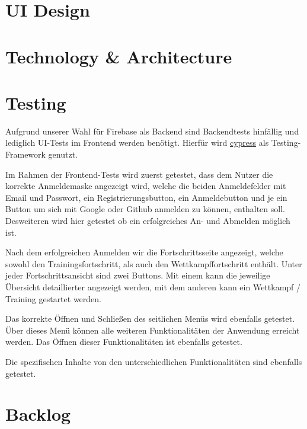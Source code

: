 \documentclass[a4paper]{article}
\theoremstyle{definition}
\begin{document}
\section{UI Design}
\section{Technology \& Architecture}

\section{Testing}
Aufgrund unserer Wahl für Firebase als Backend sind Backendtests hinfällig und lediglich UI-Tests im Frontend werden benötigt. Hierfür wird \href{https://www.cypress.io/}{cypress} als Testing-Framework genutzt.

Im Rahmen der Frontend-Tests wird zuerst getestet, dass dem Nutzer die korrekte Anmeldemaske angezeigt wird, welche die beiden Anmeldefelder mit Email und Passwort, ein Registrierungsbutton, ein Anmeldebutton und je ein Button um sich mit Google oder Github anmelden zu können, enthalten soll. Desweiteren wird hier getestet ob ein erfolgreiches An- und Abmelden möglich ist.

Nach dem erfolgreichen Anmelden wir die Fortschrittsseite angezeigt, welche sowohl den Trainingsfortschritt, als auch den Wettkampffortschritt enthält. Unter jeder Fortschrittsansicht sind zwei Buttons. Mit einem kann die jeweilige Übersicht detaillierter angezeigt werden, mit dem anderen kann ein Wettkampf / Training gestartet werden.

Das korrekte Öffnen und Schließen des seitlichen Menüs wird ebenfalls getestet. Über dieses Menü können alle weiteren Funktionalitäten der Anwendung erreicht werden. Das Öffnen dieser Funktionalitäten ist ebenfalls getestet.

Die spezifischen Inhalte von den unterschiedlichen Funktionalitäten sind ebenfalls getestet.
\section{Backlog}
\end{document}
